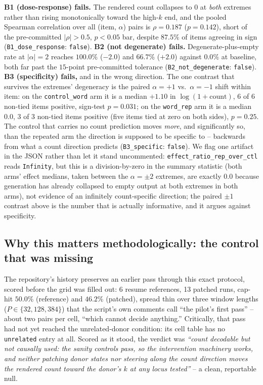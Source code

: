 \documentclass[11pt]{article}
\begin{document}
\noindent \textbf{B1 (dose-response) fails.} The rendered count collapses to
$0$ at \emph{both} extremes rather than rising monotonically toward the
high-$k$ end, and the pooled Spearman correlation over all (item, $\alpha$)
pairs is $\rho{=}0.187$ ($p{=}0.142$), short of the pre-committed $|\rho|>0.5$,
$p<0.05$ bar, despite $87.5\%$ of items agreeing in sign (\texttt{B1\_dose\_response}:
\texttt{false}). \textbf{B2 (not degenerate) fails.} Degenerate-plus-empty rate
at $|\alpha|{=}2$ reaches $100.0\%$ ($-2.0$) and $66.7\%$ ($+2.0$) against
$0.0\%$ at baseline, both far past the $15$-point pre-committed tolerance
(\texttt{B2\_not\_degenerate}: \texttt{false}). \textbf{B3 (specificity) fails,}
and in the wrong direction. The one contrast that survives the extremes'
degeneracy is the paired $\alpha{=}{+1}$ vs.\ $\alpha{=}{-1}$ shift within item:
on the \texttt{control\_word} arm it is a median $+1.10$ in $\log(1{+}\text{count})$,
$6$ of $6$ non-tied items positive, sign-test $p{=}0.031$; on the
\texttt{word\_rep} arm it is a median $0.0$, $3$ of $3$ non-tied items positive
(five items tied at zero on both sides), $p{=}0.25$. The control that carries no
count prediction moves \emph{more}, and significantly so, than the repeated arm
the direction is supposed to be specific to -- backwards from what a count
direction predicts (\texttt{B3\_specific}: \texttt{false}). We flag one
artifact in the JSON rather than let it stand uncommented:
\texttt{effect\_ratio\_rep\_over\_ctl} reads \texttt{Infinity}, but this is a
division-by-zero in the summary statistic (both arms' effect medians, taken
between the $\alpha{=}{\pm}2$ extremes, are exactly $0.0$ because generation has
already collapsed to empty output at both extremes in both arms), not evidence
of an infinitely count-specific direction; the paired $\pm1$ contrast above is
the number that is actually informative, and it argues against specificity.

\subsection{Why this matters methodologically: the control that was missing}

The repository's history preserves an earlier pass through this exact protocol,
scored before the grid was filled out: 6 resume references, 13 patched runs, cap-hit
$50.0\%$ (reference) and $46.2\%$ (patched), spread thin over three window
lengths ($P\in\{32,128,384\}$) that the script's own comments call ``the pilot's
first pass'' -- about two pairs per cell, ``which cannot decide anything.''
Critically, that pass had not yet reached the unrelated-donor condition: its
cell table has no \texttt{unrelated} entry at all. Scored as it stood, the
verdict was \emph{``count decodable but not causally used: the sanity controls
pass, so the intervention machinery works, and neither patching donor states
nor steering along the count direction moves the rendered count toward the
donor's $k$ at any locus tested''} -- a clean, reportable null.
\end{document}
